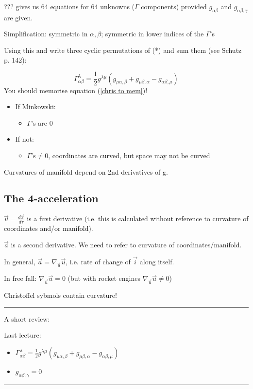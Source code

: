 \documentclass[a4paper]{article} %
\newcommand{\review}[1]
{
\hrule
A short review:

#1
\hrule
}
\begin{document}
??? gives us 64 equations for 64 unknowns ($\Gamma$ components) provided $g_{\alpha\beta}$ and $g_{\alpha\beta,\gamma}$ are given.

Simplification: symmetric in $\alpha,\beta$; symmetric in lower indices of the $\Gamma$'s

Using this and write three cyclic permutations of (*) and sum them (see Schutz p. 142):

\begin{equation}
\Gamma^{\lambda}_{\alpha\beta}=\frac{1}{2}g^{\lambda\mu}(g_{\mu\alpha,\beta}+g_{\mu\beta,\alpha}-g_{\alpha\beta,\mu})\label{chris to mem}
\end{equation}
You should memorise equation (\ref{chris to mem})!

\begin{itemize}
\item If Minkowski:
\begin{itemize}
\item $\Gamma$'s are 0
\end{itemize}
\item If not:
\begin{itemize}
\item $\Gamma\text{'s}\neq 0$, coordinates are curved, but space may not be curved
\end{itemize}
\end{itemize}

Curvatures of manifold depend on 2nd derivatives of g.

\subsection{The 4-acceleration}
$\vec{u}=\frac{d\vec{x}}{d\tau}$ is a first derivative (i.e. this is calculated without reference to curvature of coordinates and/or manifold).

$\vec{a}$ is a second derivative. We need to refer to curvature of coordinates/manifold.

In general, $\vec{a}=\nabla_{\vec{u}}\vec{u}$, i.e. rate of change of $\vec{i}$ along itself.

In free fall: $\nabla_{\vec{u}}\vec{u}=0$ (but with rocket engines $\nabla_{\vec{u}}\vec{u}\neq 0$)

Christoffel sybmols contain curvature!

\review{Last lecture: \begin{itemize}
\item $\Gamma^{\lambda}_{\alpha\beta}=\frac{1}{2}g^{\lambda\mu}(g_{\mu\alpha,\beta}+g_{\mu\beta,\alpha}-g_{\alpha\beta,\mu})$
\item $g_{\alpha\beta;\gamma}=0$
\end{itemize}
}
\end{document}
